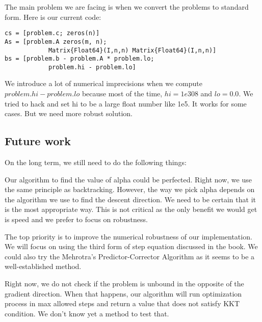 The main problem we are facing is when we convert the problems to standard form. Here is our current code:
\begin{lstlisting}
cs = [problem.c; zeros(n)]
As = [problem.A zeros(m, n);
			Matrix{Float64}(I,n,n) Matrix{Float64}(I,n,n)]
bs = [problem.b - problem.A * problem.lo;
			problem.hi - problem.lo]
\end{lstlisting}

We introduce a lot of numerical imprecisions when we compute $problem.hi - problem.lo$ because most of the time, $hi = 1e308$ and $lo=0.0$. We tried to hack and set hi to be a large float number like 1e5. It works for some cases. But we need more robust solution.

\subsection{Future work}\label{section:future}

On the long term, we still need to do the following things:

Our algorithm to find the value of alpha could be perfected. Right now, we use the same principle as backtracking. However, the way we pick alpha depends on the algorithm we use to find the descent direction. We need to be certain that it is the most appropriate way. This is not critical as the only benefit we would get is speed and we prefer to focus on robustness.

The top priority is to improve the numerical robustness of our implementation. We will focus on using the third form of step equation discussed in the book. We could also try the Mehrotra's Predictor-Corrector Algorithm as it seems to be a well-established method.

Right now, we do not check if the problem is unbound in the opposite of the gradient direction. When that happens, our algorithm will run optimization process in max allowed steps and return a value that does not satisfy KKT condition. We don't know yet a method to test that.